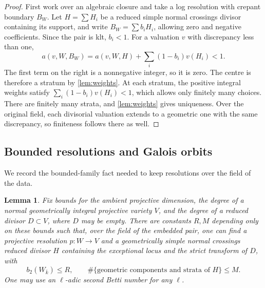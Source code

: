 \documentclass[11pt]{article}
\numberwithin{equation}{section}
\newtheorem{lemma}[theorem]{Lemma}
\theoremstyle{definition}
\begin{document}
\begin{proof}
First work over an algebraic closure and take a log resolution with
crepant boundary $B_W$. Let $H=\sum H_i$ be a reduced simple normal
crossings divisor containing its support, and write $B_W=\sum b_iH_i$,
allowing zero and negative coefficients. Since the pair is klt,
$b_i<1$. For a valuation $v$ with discrepancy less than one,
\begin{equation}\label{eq:weight-discrepancy}
 a(v,W,B_W)=a(v,W,H)+\sum_i(1-b_i)v(H_i)<1.
\end{equation}
The first term on the right is a nonnegative integer, so it is zero.
The centre is therefore a stratum by \cref{lem:weights}. At each
stratum, the positive integral weights satisfy
$\sum_i(1-b_i)v(H_i)<1$, which allows only finitely many choices.
There are finitely many strata, and \cref{lem:weights} gives uniqueness.
Over the original field, each divisorial valuation extends to a
geometric one with the same discrepancy, so finiteness follows there
as well.
\end{proof}

\subsection{Bounded resolutions and Galois orbits}

We record the bounded-family fact needed to keep resolutions over the
field of the data.

\begin{lemma}\label{lem:embedded}
Fix bounds for the ambient projective dimension, the degree of a normal
geometrically integral projective variety $V$, and the degree of a
reduced divisor $D\subset V$, where $D$ may be empty. There are constants
$R,M$ depending only on these bounds such that, over the field of the
embedded pair, one can find a projective resolution $p:W\to V$ and a
geometrically simple normal crossings reduced divisor $H$ containing
the exceptional locus and the strict transform of $D$, with
\[
 b_2(W_{\bar k})\leq R,
 \qquad
 \#\{\text{geometric components and strata of }H\}\leq M.
\]
One may use an $\ell$-adic second Betti number for any $\ell$.
\end{lemma}
\end{document}
